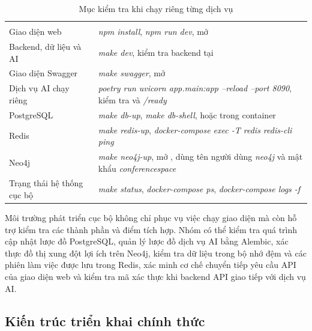 \begingroup
\setlength{\tabcolsep}{2pt}
\renewcommand{\arraystretch}{1.15}
\begin{longtable}{|C{0.46\textwidth}|P{0.46\textwidth}|}
  \caption{Mục kiểm tra khi chạy riêng từng dịch vụ}\label{tab:ch3-local-checks}\\
  \hline
       &     \\ \hline
  \endfirsthead
  \hline
       &     \\ \hline
  \endhead
  Giao diện web   &   \textit{npm install}, \textit{npm run dev}, mở  \\ \hline
  Backend, dữ liệu và AI      &      \textit{make dev}, kiểm tra backend tại  \\ \hline
  Giao diện Swagger     &     \textit{make swagger}, mở  \\ \hline
  Dịch vụ AI chạy riêng      &      \textit{poetry run uvicorn app.main:app --reload --port 8090}, kiểm tra  và \textit{/ready} \\ \hline
  PostgreSQL     &     \textit{make db-up}, \textit{make db-shell}, hoặc  trong container \\ \hline
  Redis      &      \textit{make redis-up}, \textit{docker-compose exec -T redis redis-cli ping} \\ \hline
  Neo4j     &     \textit{make neo4j-up}, mở , dùng tên người dùng \textit{neo4j} và mật khẩu \textit{conferencespace} \\ \hline
  Trạng thái hệ thống cục bộ      &      \textit{make status}, \textit{docker-compose ps}, \textit{docker-compose logs -f} \\ \hline
\end{longtable}
\endgroup

Môi trường phát triển cục bộ không chỉ phục vụ việc chạy giao diện mà còn hỗ trợ kiểm tra các thành phần và điểm tích hợp. Nhóm có thể kiểm tra quá trình cập nhật lược đồ PostgreSQL, quản lý lược đồ dịch vụ AI bằng Alembic, xác thực đồ thị xung đột lợi ích trên Neo4j, kiểm tra dữ liệu trong bộ nhớ đệm và các phiên làm việc được lưu trong Redis, xác minh cơ chế chuyển tiếp yêu cầu API của giao diện web và kiểm tra mã xác thực khi backend API giao tiếp với dịch vụ AI.

\subsection{Kiến trúc triển khai chính thức}

